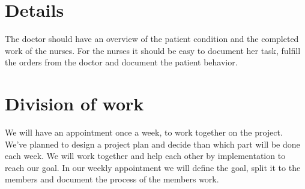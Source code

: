\documentclass{scrartcl}
\begin{document}
\section{Details}
The doctor should have an overview of the patient condition and the completed work of the nurses. For the nurses it should be easy to document her task, fulfill the orders from the doctor and document the patient behavior.
\section{Division of work}

We will have an appointment once a week, to work together on the project. We've planned to design a project plan and decide than which part will be done each week. We will work together and help each other by implementation to reach our goal.
In our weekly appointment we will define the goal, split it to the members and document the process of the members work. 

\printbibliography

\end{document}
